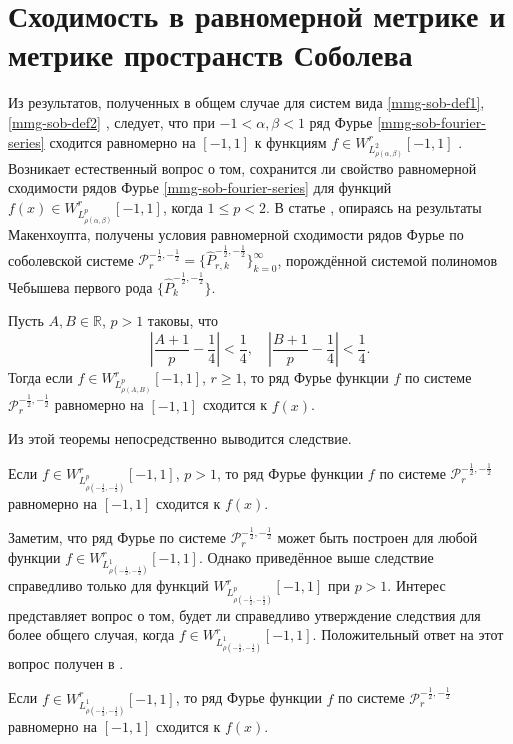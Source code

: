 \section{Сходимость в равномерной метрике и метрике пространств Соболева}
Из результатов, полученных в общем случае для систем вида \eqref{mmg-sob-def1}, \eqref{mmg-sob-def2} \cite[с. 38, теорема 2]{mmg-SharapudinovUMN}, следует, что при $-1 < \alpha, \beta < 1$ ряд Фурье \eqref{mmg-sob-fourier-series} сходится равномерно на $[-1,1]$ к функциям $f \in W^r_{L^2_{\rho(\alpha,\beta)}}[-1,1]$ \cite[с. 68, следствие 5]{mmg-SharapudinovUMN}.
Возникает естественный вопрос о том, сохранится ли свойство равномерной сходимости рядов Фурье \eqref{mmg-sob-fourier-series} для функций $f(x)\in W^r_{L^p_{\rho(\alpha,\beta)}}[-1,1]$, когда $1 \le p < 2$.
В статье \cite{mmg-Shii-izvran2018}, опираясь на результаты Макенхоупта, получены условия равномерной сходимости рядов Фурье по соболевской системе $\mathcal{P}^{-\frac12,-\frac12}_r=\{\hat{P}^{-\frac12,-\frac12}_{r,k}\}_{k=0}^\infty$, порождённой системой полиномов Чебышева первого рода $\{\hat{P}^{-\frac12,-\frac12}_{k}\}$.
\begin{theoremA}\label{mmg-st-sob-cheb-uniconv}
	Пусть $A, B \in \mathbb{R}$, $p>1$ таковы, что
	\begin{equation}\label{mmg-}
		\left|\frac{A+1}{p}-\frac{1}{4}\right|<\frac{1}{4},\quad
		\left|\frac{B+1}{p}-\frac{1}{4}\right|<\frac{1}{4}.
	\end{equation}
	Тогда если $f\in W^r_{L_{\rho(A,B)}^p}[-1,1]$, $r \ge 1$, то ряд Фурье функции $f$ по системе $\mathcal{P}^{-\frac12,-\frac12}_r$ равномерно на $[-1,1]$ сходится к $f(x)$.
\end{theoremA}
Из этой теоремы непосредственно выводится следствие.
\begin{corollaryA}
	Если $f \in W^r_{L_{\rho(-\frac{1}{2},-\frac{1}{2})}^p}[-1,1]$, $p>1$, то ряд Фурье функции $f$ по системе $\mathcal{P}^{-\frac12,-\frac12}_r$ равномерно на $[-1,1]$ сходится к $f(x)$.
\end{corollaryA}
Заметим, что ряд Фурье по системе $\mathcal{P}^{-\frac12,-\frac12}_r$ может быть построен для любой функции $f \in W^r_{L_{\rho(-\frac{1}{2},-\frac{1}{2})}^1}[-1,1]$. Однако приведённое выше следствие справедливо только для функций $W^r_{L_{\rho(-\frac{1}{2},-\frac{1}{2})}^p}[-1,1]$ при $p>1$. Интерес представляет вопрос о том, будет ли справедливо утверждение следствия для более общего случая, когда $f \in W^r_{L_{\rho(-\frac{1}{2},-\frac{1}{2})}^1}[-1,1]$. Положительный ответ на этот вопрос получен в \cite[теорема 6]{mmg-Shii-izvran2018}.
\begin{theoremA}
	Если $f \in W^r_{L_{\rho(-\frac{1}{2},-\frac{1}{2})}^1}[-1,1]$, то ряд Фурье функции $f$ по системе $\mathcal{P}^{-\frac12,-\frac12}_r$ равномерно на $[-1,1]$ сходится к $f(x)$.
\end{theoremA}

